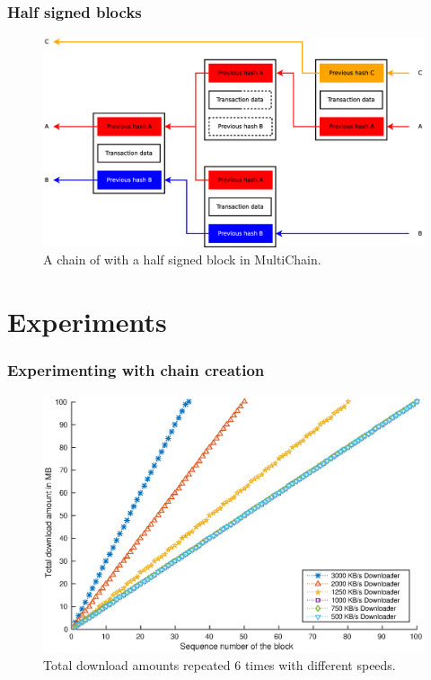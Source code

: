\documentclass{beamer}
\begin{document}
\begin{frame}
\frametitle{Half signed blocks}
\begin{figure}
	\centerline{\includegraphics[scale=0.25]{images/design/halfsigned-chain.eps}}
	\caption{A chain of with a half signed block in MultiChain.}
	\end{figure}

\end{frame}

\section{Experiments}

\begin{frame}
\frametitle{Experimenting with chain creation}

\begin{figure}
\centerline{\includegraphics[scale=0.5]{images/experimentation/synthetic-simple-down.eps}}
\caption{Total download amounts repeated 6 times with different speeds.}
\end{figure}
\end{frame}
\end{document}
